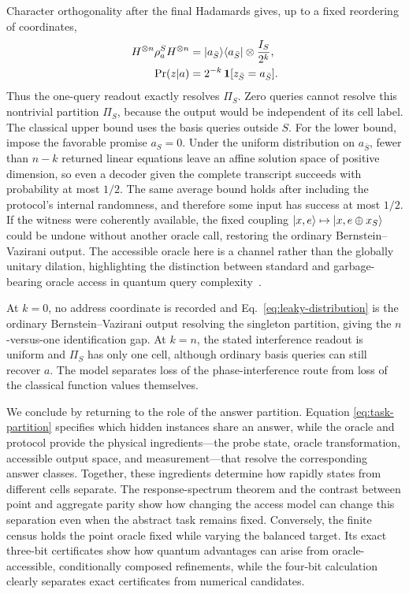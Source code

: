 \documentclass[
  aps,
  prl,
  reprint,
  nofootinbib
]{revtex4-2}
\begin{document}
Character orthogonality after the final Hadamards gives, up to a fixed
reordering of coordinates,
\begin{equation}
\begin{aligned}
 H^{\otimes n}\rho_a^S H^{\otimes n}
 &=\ket{a_{\bar S}}\!\bra{a_{\bar S}}\otimes\frac{I_S}{2^k},\\
 \Pr(z|a)&=2^{-k}\,\mathbf 1[z_{\bar S}=a_{\bar S}].
\end{aligned}
 \label{eq:leaky-distribution}
\end{equation}
Thus the one-query readout exactly resolves \(\Pi_S\). Zero queries cannot
resolve this nontrivial
partition \(\Pi_S\), because the output would be independent of its cell
label. The classical upper bound uses the basis queries outside \(S\). For the
lower bound, impose the favorable promise \(a_S=0\). Under the uniform
distribution on \(a_{\bar S}\), fewer than \(n-k\) returned linear equations
leave an affine solution space of positive dimension, so even a decoder given
the complete transcript succeeds with probability at most \(1/2\). The same
average bound holds after including the protocol's internal randomness, and
therefore some input has success at most \(1/2\). If the witness were
coherently available, the fixed coupling
\(\ket{x,e}\mapsto\ket{x,e\oplus x_S}\) could be undone without another
oracle call, restoring the ordinary Bernstein--Vazirani output. The
accessible oracle here is a channel rather than the globally unitary dilation,
highlighting the distinction between standard and garbage-bearing oracle
access in quantum query complexity~\cite{Aaronson2021OpenProblems}.

At \(k=0\), no address coordinate is recorded and
Eq.~\eqref{eq:leaky-distribution} is the ordinary Bernstein--Vazirani output
resolving the singleton partition, giving the \(n\)-versus-one
identification gap.
At \(k=n\), the stated interference readout is uniform and
\(\Pi_S\) has only one cell, although ordinary basis queries can still
recover \(a\). The model separates loss of the phase-interference route from
loss of the classical function values themselves.

We conclude by returning to the role of the answer partition. Equation
\eqref{eq:task-partition} specifies which hidden instances share an answer,
while the oracle and protocol provide the physical ingredients---the probe
state, oracle transformation, accessible output space, and measurement---that
resolve the corresponding answer classes. Together, these ingredients
determine how rapidly states from different cells separate. The
response-spectrum theorem and the contrast between point and aggregate parity
show how changing the access model can change this separation even when the
abstract task remains fixed. Conversely, the finite census holds the point
oracle fixed while varying the balanced target. Its exact three-bit
certificates show how quantum advantages can arise from oracle-accessible,
conditionally composed refinements, while the four-bit calculation clearly
separates exact certificates from numerical candidates.
\end{document}
